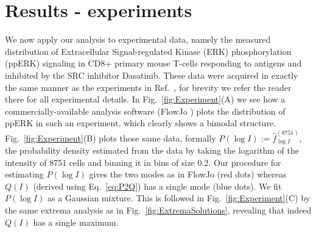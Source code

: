 \documentclass[11pt,a4paper,draft]{article}
\begin{document}
\newpage

\section*{Results - experiments}

We now apply our analysis to experimental data, namely the measured distribution of Extracellular Signal-regulated Kinase (ERK) phosphorylation (ppERK) signaling in CD8+ primary mouse T-cells responding to antigens and inhibited by the SRC inhibitor Dasatinib. These data were acquired in exactly the same manner as the experiments in Ref.~\cite{Vogel2016}, for brevity we refer the reader there for all experimental details. In Fig.~\ref{fig:Experiment}(A) we see how a commercially-available analysis software (FlowJo \cite{FlowJo}) plots the distribution of ppERK in such an experiment, which clearly shows a bimodal structure. Fig.~\ref{fig:Experiment}(B) plots those same data, formally $P(\log I) := \hat{f}_{\log I}^{(8751)}$, the probability density estimated from the data by taking the logarithm of the intensity of 8751 cells and binning it in bins of size 0.2. Our procedure for estimating $P(\log I)$ gives the two modes as in FlowJo (red dots) whereas $Q(I)$ (derived using Eq.~\ref{eq:P2Q}) has a single mode (blue dots). We fit $P(\log I)$ as a Gaussian mixture. This is followed in Fig.~\ref{fig:Experiment}(C) by the same extrema analysis as in Fig.~\ref{fig:ExtremaSolutions}, revealing that indeed $Q(I)$ has a single maximum.
\smallskip
\end{document}

